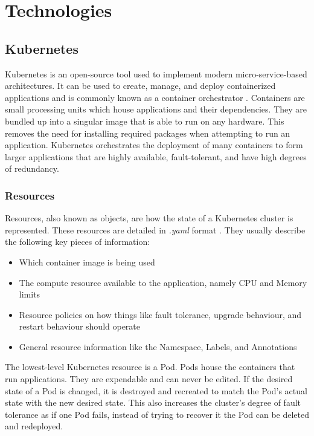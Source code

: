 \documentclass{article}
\begin{document}
\section{Technologies} \label{technologies} 



\subsection{Kubernetes}

Kubernetes is an open-source tool used to implement modern micro-service-based architectures. It can be used to create, manage, and deploy containerized applications and is commonly known as a container orchestrator \cite{k8s-overview}. Containers are small processing units which house applications and their dependencies. They are bundled up into a singular image that is able to run on any hardware. This removes the need for installing required packages when attempting to run an application. Kubernetes orchestrates the deployment of many containers to form larger applications that are highly available, fault-tolerant, and have high degrees of redundancy.



\subsubsection{Resources} \label{resources}

Resources, also known as objects, are how the state of a Kubernetes cluster is represented. These resources are detailed in \emph{.yaml} format \cite{k8s-obj}. They usually describe the following key pieces of information:

\begin{itemize}
    \itemsep0em 
    \item Which container image is being used
    \item The compute resource available to the application, namely CPU and Memory limits
    \item Resource policies on how things like fault tolerance, upgrade behaviour, and restart behaviour should operate
    \item General resource information like the Namespace, Labels, and Annotations
\end{itemize}

The lowest-level Kubernetes resource is a Pod. Pods house the containers that run applications. They are expendable and can never be edited. If the desired state of a Pod is changed, it is destroyed and recreated to match the Pod's actual state with the new desired state. This also increases the cluster's degree of fault tolerance as if one Pod fails, instead of trying to recover it the Pod can be deleted and redeployed. 
\end{document}
